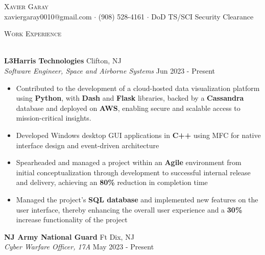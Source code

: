 \documentclass[a4paper]{article}
\newcommand{\lineunder} {
        \vspace*{-8pt} \\
        \hspace*{-18pt} \hrulefill \\
    }
\newcommand{\header} [1] {
        {\hspace*{-18pt}\vspace*{6pt} \textsc{#1}}
        \vspace*{-6pt} \lineunder
    }
\begin{document}
    \vspace*{-40pt}
    
    \vspace*{-10pt}
    \begin{center}
        {\Huge \scshape {Xavier Garay}}\\
        xaviergaray0010@gmail.com $\cdot$ (908) 528-4161 $\cdot$ DoD TS/SCI Security Clearance\\
    \end{center}
    
    \header{Work Experience}
    \vspace{1mm}
    
                \textbf{L3Harris Technologies} \hfill Clifton, NJ\\
                \textit{Software Engineer, Space and Airborne Systems} \hfill Jun 2023 - Present\\
                \vspace{-1mm}
                \begin{itemize} \itemsep 1pt
                
                \item Contributed to the development of a cloud-hosted data visualization platform using \textbf{Python}, with \textbf{Dash} and \textbf{Flask} libraries, backed by a \textbf{Cassandra} database and deployed on \textbf{AWS}, enabling secure and scalable access to mission-critical insights.
                \item Developed Windows desktop GUI applications in \textbf{C++} using MFC for native interface design and event-driven architecture
                \item Spearheaded and managed a project within an \textbf{Agile} environment from initial conceptualization through development to successful internal release and delivery, achieving an \textbf{80\%} reduction in completion time
                \item Managed the project’s \textbf{SQL database} and implemented new features on the user interface, thereby enhancing the overall user experience and a \textbf{30\%} increase functionality of the project\end{itemize}
                \textbf{NJ Army National Guard} \hfill Ft Dix, NJ\\
                \textit{Cyber Warfare Officer, 17A} \hfill May 2023 - Present\\
                \vspace{-1mm}
\end{document}

